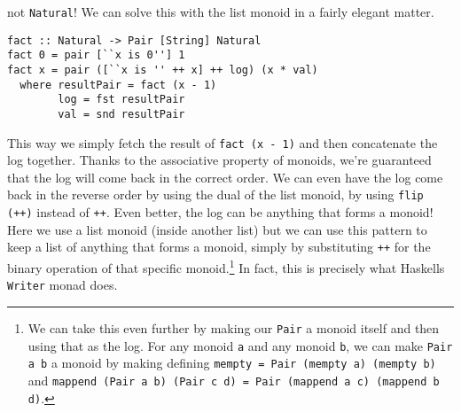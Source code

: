 \documentclass{acm_proc_article-sp}
\begin{document}
not \texttt{Natural}! We can solve this with the list monoid in a fairly
elegant matter.
\begin{lstlisting}
fact :: Natural -> Pair [String] Natural
fact 0 = pair [``x is 0''] 1
fact x = pair ([``x is '' ++ x] ++ log) (x * val)
  where resultPair = fact (x - 1)
        log = fst resultPair
        val = snd resultPair
\end{lstlisting}
This way we simply fetch the result of \texttt{fact (x - 1)} and then
concatenate the log together. Thanks to the associative property of
monoids, we're guaranteed that the log will come back in the correct
order. We can even have the log come back in the reverse order by
using the dual of the list monoid, by using \texttt{flip (++)} instead of
\texttt{++}. Even better, the log can be anything that forms a monoid! Here
we use a list monoid (inside another list) but we can use this pattern
to keep a list of anything that forms a monoid, simply by
substituting \texttt{++} for the binary operation of that specific
monoid.\footnote{We can take this even further by making our \texttt{Pair} a
  monoid itself and then using that as the log. For any monoid \texttt{a} and
any monoid \texttt{b}, we can make \texttt{Pair a b} a monoid by making defining
\texttt{mempty = Pair (mempty a) (mempty b)} and \texttt{mappend (Pair a b) (Pair c
d) = Pair (mappend a c) (mappend b d)}.} In
fact, this is precisely what Haskells \texttt{Writer} monad does.
\end{document}
